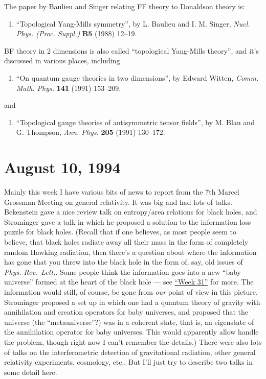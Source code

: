\documentclass{article}
\def\tightlist{}
\begin{document}
The paper by Baulieu and Singer relating FF theory to Donaldson theory
is:

\begin{enumerate}
\def\labelenumi{\arabic{enumi})}
\setcounter{enumi}{3}
\tightlist
\item
  ``Topological Yang-Mills symmetry'', by L. Baulieu and I. M. Singer,
  \emph{Nucl. Phys. (Proc. Suppl.)} \textbf{B5} (1988) 12--19.
\end{enumerate}

BF theory in 2 dimensions is also called ``topological Yang-Mills
theory'', and it's discussed in various places, including

\begin{enumerate}
\def\labelenumi{\arabic{enumi})}
\setcounter{enumi}{4}
\tightlist
\item
  ``On quantum gauge theories in two dimensions'', by Edward Witten,
  \emph{Comm. Math. Phys.} \textbf{141} (1991) 153--209.
\end{enumerate}

and

\begin{enumerate}
\def\labelenumi{\arabic{enumi})}
\setcounter{enumi}{5}
\tightlist
\item
  ``Topological gauge theories of antisymmetric tensor fields'', by M.
  Blau and G. Thompson, \emph{Ann. Phys.} \textbf{205} (1991) 130--172.
\end{enumerate}
\hypertarget{week37}{%
\section{August 10, 1994}\label{week37}}

Mainly this week I have various bits of news to report from the 7th
Marcel Grossman Meeting on general relativity. It was big and had lots
of talks. Bekenstein gave a nice review talk on entropy/area relations
for black holes, and Strominger gave a talk in which he proposed a
solution to the information loss puzzle for black holes. (Recall that if
one believes, as most people seem to believe, that black holes radiate
away all their mass in the form of completely random Hawking radiation,
then there's a question about where the information has gone that you
threw into the black hole in the form of, say, old issues of \emph{Phys.
Rev.~Lett.}. Some people think the information goes into a new ``baby
universe'' formed at the heart of the black hole --- see
\protect\hyperlink{week31}{``Week 31''} for more. The information would
still, of course, be gone from \emph{our} point of view in this picture.
Strominger proposed a set up in which one had a quantum theory of
gravity with annihilation and creation operators for baby universes, and
proposed that the universe (the ``metauniverse''?) was in a coherent
state, that is, an eigenstate of the annihilation operator for baby
universes. This would apparently allow handle the problem, though right
now I can't remember the details.) There were also lots of talks on the
interferometric detection of gravitational radiation, other general
relativity experiments, cosmology, etc.. But I'll just try to describe
two talks in some detail here.
\end{document}
